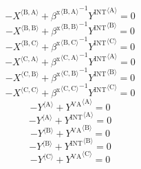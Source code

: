 \begin{equation}
-{X}^{\langle \mathrm{B},\mathrm{A}\rangle} + {{\beta^{\mathrm{x}}}^{\langle \mathrm{\mathrm{B}},\mathrm{\mathrm{A}}\rangle}}^{-1} {{Y^{\mathrm{INT}}}^{\langle \mathrm{A}\rangle}} = 0
\end{equation}
\begin{equation}
-{X}^{\langle \mathrm{B},\mathrm{B}\rangle} + {{\beta^{\mathrm{x}}}^{\langle \mathrm{\mathrm{B}},\mathrm{\mathrm{B}}\rangle}}^{-1} {{Y^{\mathrm{INT}}}^{\langle \mathrm{B}\rangle}} = 0
\end{equation}
\begin{equation}
-{X}^{\langle \mathrm{B},\mathrm{C}\rangle} + {{\beta^{\mathrm{x}}}^{\langle \mathrm{\mathrm{B}},\mathrm{\mathrm{C}}\rangle}}^{-1} {{Y^{\mathrm{INT}}}^{\langle \mathrm{C}\rangle}} = 0
\end{equation}
\begin{equation}
-{X}^{\langle \mathrm{C},\mathrm{A}\rangle} + {{\beta^{\mathrm{x}}}^{\langle \mathrm{\mathrm{C}},\mathrm{\mathrm{A}}\rangle}}^{-1} {{Y^{\mathrm{INT}}}^{\langle \mathrm{A}\rangle}} = 0
\end{equation}
\begin{equation}
-{X}^{\langle \mathrm{C},\mathrm{B}\rangle} + {{\beta^{\mathrm{x}}}^{\langle \mathrm{\mathrm{C}},\mathrm{\mathrm{B}}\rangle}}^{-1} {{Y^{\mathrm{INT}}}^{\langle \mathrm{B}\rangle}} = 0
\end{equation}
\begin{equation}
-{X}^{\langle \mathrm{C},\mathrm{C}\rangle} + {{\beta^{\mathrm{x}}}^{\langle \mathrm{\mathrm{C}},\mathrm{\mathrm{C}}\rangle}}^{-1} {{Y^{\mathrm{INT}}}^{\langle \mathrm{C}\rangle}} = 0
\end{equation}
\begin{equation}
-{Y}^{\langle \mathrm{A}\rangle} + {Y^{\mathrm{VA}}}^{\langle \mathrm{A}\rangle} = 0
\end{equation}
\begin{equation}
-{Y}^{\langle \mathrm{A}\rangle} + {Y^{\mathrm{INT}}}^{\langle \mathrm{A}\rangle} = 0
\end{equation}
\begin{equation}
-{Y}^{\langle \mathrm{B}\rangle} + {Y^{\mathrm{VA}}}^{\langle \mathrm{B}\rangle} = 0
\end{equation}
\begin{equation}
-{Y}^{\langle \mathrm{B}\rangle} + {Y^{\mathrm{INT}}}^{\langle \mathrm{B}\rangle} = 0
\end{equation}
\begin{equation}
-{Y}^{\langle \mathrm{C}\rangle} + {Y^{\mathrm{VA}}}^{\langle \mathrm{C}\rangle} = 0
\end{equation}
